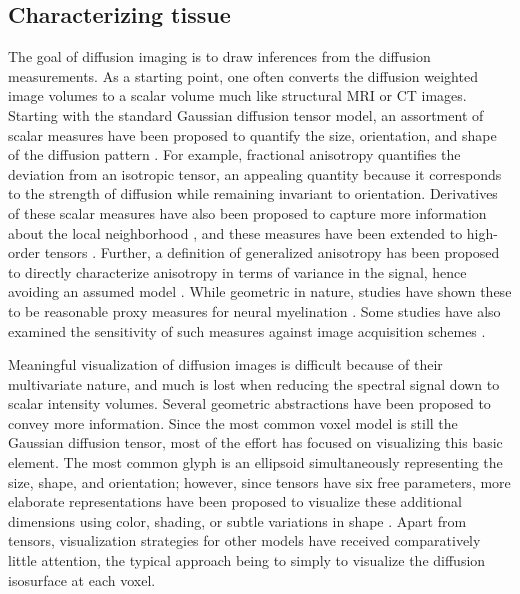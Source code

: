 \documentclass[final,hyperref]{gatech-thesis}
\begin{document}
\subsection{Characterizing tissue}

The goal of diffusion imaging is to draw inferences from the diffusion
measurements.
%
As a starting point, one often converts the diffusion weighted image volumes
to a scalar volume much like structural MRI or CT images.
%
Starting with the standard Gaussian diffusion tensor model, an assortment of
scalar measures have been proposed to quantify the size, orientation, and
shape of the diffusion pattern \cite{Basser1996,Westin2002}.  For example,
fractional anisotropy quantifies the deviation from an isotropic tensor, an
appealing quantity because it corresponds to the strength of diffusion while
remaining invariant to orientation.
%
Derivatives of these scalar measures have also been proposed to capture more
information about the local neighborhood
\cite{Kindlmann2007tmi,Savadjiev2009}, and these measures have been extended
to high-order tensors \cite{Ozarslan2005}.
%
Further, a definition of generalized anisotropy has been proposed to directly
characterize anisotropy in terms of variance in the signal, hence avoiding an
assumed model \cite{Tuch2002}.
%
While geometric in nature, studies have shown these to be reasonable proxy
measures for neural myelination \cite{Norris2001,Beaulieu2002,Jones2003}.
Some studies have also examined the sensitivity of such measures against image
acquisition schemes \cite{Whitcher2008,Chung2006}.

Meaningful visualization of diffusion images is difficult because of their
multivariate nature, and much is lost when reducing the spectral signal down
to scalar intensity volumes.
%
Several geometric abstractions have been proposed to convey more information.
%
Since the most common voxel model is still the Gaussian diffusion tensor, most
of the effort has focused on visualizing this basic element.  The most common
glyph is an ellipsoid simultaneously representing the size, shape, and
orientation; however, since tensors have six free parameters, more elaborate
representations have been proposed to visualize these additional dimensions
using color, shading, or subtle variations in shape
\cite{Westin2002,Ennis2005,Vilanova2006,Kindlmann2007miccai}.
%
Apart from tensors, visualization strategies for other models have received
comparatively little attention, the typical approach being to simply to
visualize the diffusion isosurface at each voxel.
\end{document}
